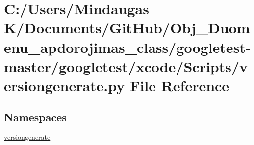 \hypertarget{googletest-master_2googletest_2xcode_2_scripts_2versiongenerate_8py}{}\section{C\+:/\+Users/\+Mindaugas K/\+Documents/\+Git\+Hub/\+Obj\+\_\+\+Duomenu\+\_\+apdorojimas\+\_\+class/googletest-\/master/googletest/xcode/\+Scripts/versiongenerate.py File Reference}
\label{googletest-master_2googletest_2xcode_2_scripts_2versiongenerate_8py}
\subsection*{Namespaces}
\begin{DoxyCompactItemize}
\item 
 \mbox{\hyperlink{namespaceversiongenerate}{versiongenerate}}
\end{DoxyCompactItemize}
